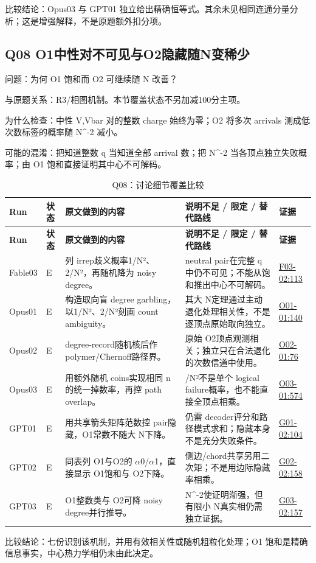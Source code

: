 \documentclass[11pt,a4paper]{article}
\begin{document}
比较结论：Opus03 与 GPT01 独立给出精确恒等式。其余未见相同连通分量分析；这是增强解释，不是原题额外扣分项。

\clearpage
\subsection{Q08 O1中性对不可见与O2隐藏随N变稀少}
\label{aspect:Q08}
问题：为何 O1 饱和而 O2 可继续随 N 改善？

与原题关系：R3/相图机制。本节覆盖状态不另加减100分主项。

为什么检查：中性 V,Vbar 对的整数 charge 始终为零；O2 将多次 arrivals 测成低次数标签的概率随 N\textasciicircum{}-2 减小。

可能的混淆：把知道整数 q 当知道全部 arrival 数；把 N\textasciicircum{}-2 当各顶点独立失败概率；由 O1 饱和直接证明其中心不可解码。

{\fontsize{9.0}{12.6}\selectfont
\setlength{\tabcolsep}{2.5pt}
\begin{longtable}{>{\raggedright\arraybackslash}p{}>{\raggedright\arraybackslash}p{}>{\raggedright\arraybackslash}p{}>{\raggedright\arraybackslash}p{}>{\raggedright\arraybackslash}p{}}
\caption{Q08：讨论细节覆盖比较}\\
\toprule
\textbf{Run} & \textbf{状态} & \textbf{原文做到的内容} & \textbf{说明不足 / 限定 / 替代路线} & \textbf{证据}\tabularnewline
\midrule
\endfirsthead
\toprule
\textbf{Run} & \textbf{状态} & \textbf{原文做到的内容} & \textbf{说明不足 / 限定 / 替代路线} & \textbf{证据}\tabularnewline
\midrule
\endhead
{}Fable03 & E & 列 irrep歧义概率1/N²、2/N²，再随机降为 noisy degree。 & neutral pair在完整 q中仍不可见；不能从饱和推出中心不可解码。 & \hyperref[src:F03-02]{F03-02:113}\tabularnewline
{}Opus01 & E & 构造取向盲 degree garbling，以1/N²、2/N²刻画 count ambiguity。 & 其大 N定理通过主动退化处理相关性，不是逐顶点原始取向独立。 & \hyperref[src:O01-01]{O01-01:140}\tabularnewline
{}Opus02 & E & degree-record随机核后作 polymer/Chernoff路径界。 & 原始 O2顶点观测相关；独立只在合法退化的次数信道中使用。 & \hyperref[src:O02-01]{O02-01:76}\tabularnewline
{}Opus03 & E & 用额外随机 coins实现相同 n的统一掉数率，再控 path overlap。 & 1/N²不是单个 logical failure概率，也不能直接全顶点相乘。 & \hyperref[src:O03-01]{O03-01:574}\tabularnewline
{}GPT01 & E & 用共享箭头矩阵范数控 pair隐藏，O1常数不随大 N下降。 & 仍需 decoder评分和路径模式求和；隐藏本身不是充分失败条件。 & \hyperref[src:G01-02]{G01-02:104}\tabularnewline
{}GPT02 & E & 同表列 O1与O2的 \ensuremath{\alpha}0/\ensuremath{\alpha}1，直接显示 O1饱和与 O2下降。 & 侧边/chord共享另用二次矩；不是用边际隐藏率相乘。 & \hyperref[src:G02-02]{G02-02:158}\tabularnewline
{}GPT03 & E & O1整数类与 O2可降 noisy degree并行推导。 & N\textasciicircum{}-2使证明渐强，但有限小 N真实相仍需独立证据。 & \hyperref[src:G03-02]{G03-02:157}\tabularnewline
\bottomrule
\end{longtable}
}
比较结论：七份识别该机制，并用有效相关性或随机粗粒化处理；O1 饱和是精确信息事实，中心热力学相仍未由此决定。
\end{document}
